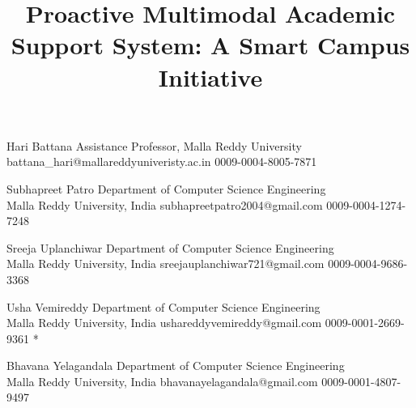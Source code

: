\documentclass[]{einformatica}
\begin{document}
\title{Proactive Multimodal Academic Support System: A Smart Campus Initiative}


\eIsubmitted{} 
\eIrevised{-} 
\eIaccepted{-}
\eIpublished{-} 

\EIauthorII
   {Hari}
   {Battana}
   {Assistance Professor, Malla Reddy University}
   {battana\_hari@mallareddyuniveristy.ac.in}
   {0009-0004-8005-7871} %
   {} %


\EIauthorIV
   {Subhapreet}
   {Patro}
   {Department of Computer Science Engineering \\ Malla Reddy University, India}
   {subhapreetpatro2004@gmail.com}
   {0009-0004-1274-7248} %
   {} %

\EIauthorIII
   {Sreeja}
   {Uplanchiwar}
   {Department of Computer Science Engineering \\ Malla Reddy University, India}
   {sreejauplanchiwar721@gmail.com}
   {0009-0004-9686-3368} %
   {} %

\EIauthorI
   {Usha}
   {Vemireddy}
   {Department of Computer Science Engineering \\ Malla Reddy University, India}
   {ushareddyvemireddy@gmail.com}
   {0009-0001-2669-9361} %
   {*} %

\EIauthorV
   {Bhavana}
   {Yelagandala}
   {Department of Computer Science Engineering \\ Malla Reddy University, India}
   {bhavanayelagandala@gmail.com}
   {0009-0001-4807-9497} %
   {} %
   
\end{document}
